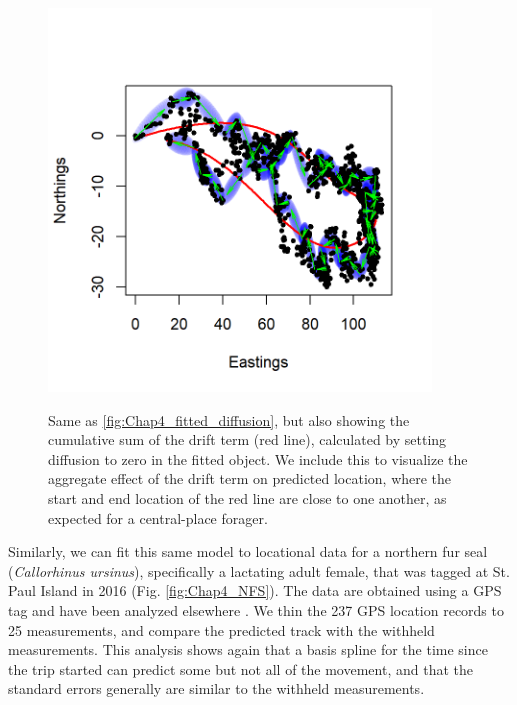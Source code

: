 \begin{figure}[!ht]
    \caption[Reconstructed track with estimated drift using bivariate model]{Same as \ref{fig:Chap4_fitted_diffusion}, but also showing the cumulative sum of the drift term (red line), calculated by setting diffusion to zero in the fitted object. We include this to visualize the aggregate effect of the drift term on predicted location, where the start and end location of the red line are close to one another, as expected for a central-place forager.}
    \centering
    \includegraphics[width=4in]{Chap_4/fitted_drift.png}
    \label{fig:Chap4_fitted_drift}
\end{figure}

Similarly, we can fit this same model to locational data for a northern fur seal (\textit{Callorhinus ursinus}), specifically a lactating adult female, that was tagged at St. Paul Island in 2016 (Fig. \ref{fig:Chap4_NFS}).  The data are obtained using a GPS tag and have been analyzed elsewhere \cite{kuhn_test_2020}.  We thin the 237 GPS location records to 25 measurements, and compare the predicted track with the withheld measurements.  This analysis shows again that a basis spline for the time since the trip started can predict some but not all of the movement, and that the standard errors generally are similar to the withheld measurements.  

